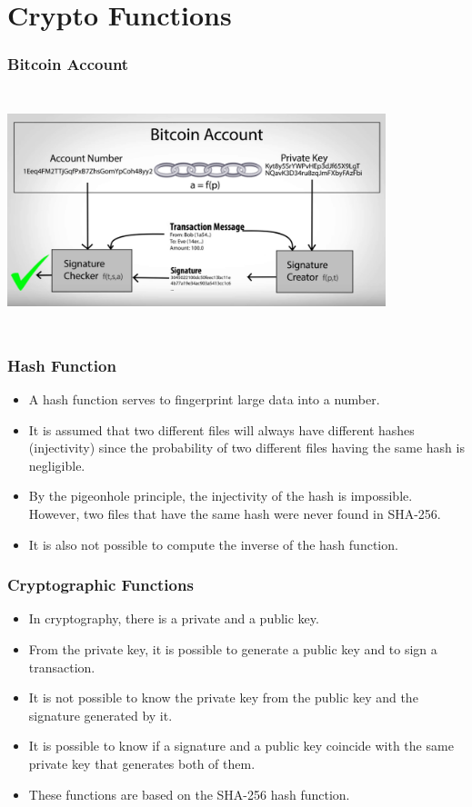 \documentclass{beamer}
\begin{document}
\section{Crypto Functions}

\begin{frame}
  \frametitle{Bitcoin Account}
    \includegraphics[width=11cm, height=7cm]{privatekey}
  \hspace*{15pt}\hbox{\scriptsize {}}
\end{frame}

\begin{frame}
  \frametitle{Hash Function}
  \begin{itemize}[<+->]
    \item A hash function serves to fingerprint large data into a number.
    \item It is assumed that two different files will always have different hashes (injectivity)
   since the probability of two different files having the same hash is negligible.
    \item By the pigeonhole principle, the injectivity of the hash is impossible.
      However, two files that have the same hash were never found in SHA-256.
    \item It is also not possible to compute the inverse of the hash function.
  \end{itemize}
\end{frame}

\begin{frame}
  \frametitle{Cryptographic Functions}
  \begin{itemize}[<+->]
    \item In cryptography, there is a private and a public key.
    \item From the private key, it is possible to generate a public key
 and to sign a transaction.
    \item It is not possible to know the private key from the public key and the signature generated by it.
    \item It is possible to know if a signature and a public key coincide with the same private key that generates both of them.
    \item These functions are based on the SHA-256 hash function.
  \end{itemize}
\end{frame}
\end{document}
